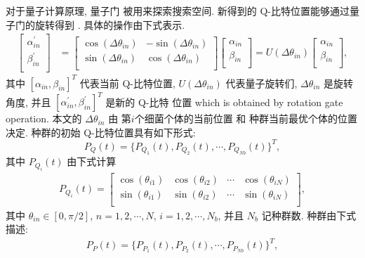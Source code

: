 对于量子计算原理, 量子门 被用来探索搜索空间. 新得到的 Q-比特位置能够通过量子门的旋转得到 . 具体的操作由下式表示.
 \begin{align}
\left [
\begin{array}{c}
\alpha_{in}^{'}\\
\beta_{in}^{'}\\
\end{array}\right]
&=\left [\begin{array}{cc}
\cos(\Delta\theta_{in}) &  -\sin(\Delta\theta_{in}) \\
\sin(\Delta\theta_{in})&  \cos(\Delta\theta_{in}) \\
\end{array}\right]
\left [\begin{array}{c}
\alpha_{in}\\
\beta_{in}\\
\end{array}\right]
=U(\Delta\theta_{in})
\left [\begin{array}{c}
\alpha_{in}\\
\beta_{in}\\
\end{array}\right],\label{rotationgate}
\end{align}
其中 $[\alpha_{in},\beta_{in}]^T$ 代表当前 Q-比特位置, $U(\Delta\theta_{in})$ 代表量子旋转们, $\Delta\theta_{in}$ 是旋转角度, 并且 $[\alpha_{in}^{'}, \beta_{in}^{'}]^T$ 是新的 Q-比特 位置 which is obtained by rotation gate operation. 本文的  $\Delta\theta_{in}$ 由 第$i$个细菌个体的当前位置 和 种群当前最优个体的位置决定. 种群的初始 Q-比特位置具有如下形式:
\begin{equation}
    P_{Q}(t)=\{P_{Q_1}(t), P_{Q_2}(t),\cdots,P_{Q_{Nb}}(t)\}^T,\label{PQt}
\end{equation}
其中 $P_{Q_{i}}(t)$ 由下式计算
\begin{gather}
P_{Q_i}(t)=\left [\begin{array}{cccc}\label{init_Qindividual}
\cos(\theta_{i1}) &  \cos(\theta_{i2})  &  \cdots&  \cos(\theta_{iN})\\
\sin(\theta_{i1})&  \sin(\theta_{i2})&  \cdots &  \sin(\theta_{iN})\\
\end{array}\right],
\end{gather}
其中 $\theta_{in}\in[0,\pi/2]$, $n=1,2, \cdots, N$, $i=1,2,\cdots, N_b$, 并且 $N_b$ 记种群数. 种群由下式描述:
\begin{align}\label{measure_ppi}
    P_{P}(t)= \{P_{P_1}(t), P_{P_2}(t),\cdots,P_{P_{Nb}}(t)\}^T,
\end{align}

